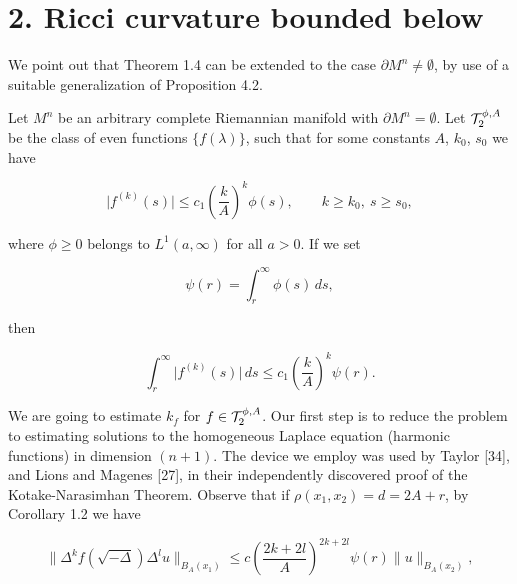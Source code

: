 \chapter{2. Ricci curvature bounded below}

We point out that Theorem 1.4 can be extended to the case $\partial M^n \neq \emptyset$, by
use of a suitable generalization of Proposition 4.2.

\bigskip

Let $M^n$ be an arbitrary complete Riemannian manifold with $\partial M^n = \emptyset$.
Let $\mathcal{T}_2^{\phi,A}$ be the class of even functions $\{f(\lambda)\}$, such that for some constants
$A$, $k_0$, $s_0$ we have

\begin{equation}\tag{2.1}
\bigl|f^{(k)}(s)\bigr| \le c_1\left(\frac{k}{A}\right)^k \phi(s),\qquad k \ge k_0,\ s \ge s_0,
\end{equation}

where $\phi \ge 0$ belongs to $L^1(a,\infty)$ for all $a > 0$. If we set

\begin{equation}\tag{2.2}
\psi(r) = \int_r^\infty \phi(s)\,ds,
\end{equation}

then

\begin{equation}\tag{2.3}
\int_r^\infty \bigl|f^{(k)}(s)\bigr|\,ds \le c_1\left(\frac{k}{A}\right)^k \psi(r).
\end{equation}

We are going to estimate $k_f$ for $f \in \mathcal{T}_2^{\phi,A}$. Our first step is to reduce the
problem to estimating solutions to the homogeneous Laplace equation
(harmonic functions) in dimension $(n+1)$. The device we employ was used by
Taylor [34], and Lions and Magenes [27], in their independently discovered
proof of the Kotake-Narasimhan Theorem. Observe that if $\rho(x_1, x_2) = d =
2A + r$, by Corollary 1.2 we have

\begin{equation}\tag{2.4}
\bigl\|\Delta^k f(\sqrt{-\Delta})\Delta^l u\bigr\|_{B_A(x_1)}
\le c\left(\frac{2k + 2l}{A}\right)^{2k+2l}\psi(r)\|u\|_{B_A(x_2)},
\end{equation}

